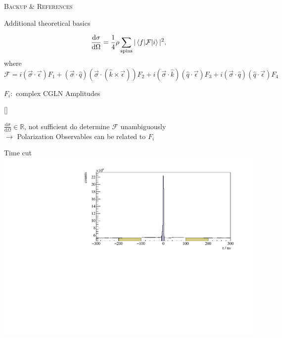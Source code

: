 \documentclass[11pt,aspectratio=169,dvipsnames]{beamer}
\newcommand{\thecolor}{black!70!blue}
\begin{document}
	\appendix
	\begin{frame}
		\centering
		\LARGE
		\color{\thecolor}\textsc{Backup \& References}
	\end{frame}
	\begin{frame}{Additional theoretical basics}
	\begin{tcolorbox}[colback=blue!5,colframe=\thecolor,title=Unpolarized differential cross section]
		
		$$\frac{\text{d}\sigma}{\text{d}\Omega}=\frac{1}{4}\rho\sum_{\text{spins}}|\braket{f|\mathcal{F}|i}|^2\\,$$
		where
		$$\mathcal{F}=i(\vec{\sigma}\cdot\vec{\epsilon})F_1+(\vec{\sigma}\cdot\hat{q})(\vec{\sigma}\cdot(\hat{k}\times\vec{\epsilon}))F_2+i(\vec{\sigma}\cdot\hat{k})(\hat{q}\cdot\vec{\epsilon})F_3+i(\vec{\sigma}\cdot\hat{q})(\hat{q}\cdot\vec{\epsilon})F_4$$
		\begin{flushright}
			$F_i:$ complex CGLN Amplitudes
		\end{flushright}
		
		
		\begin{flushright}
			{\scriptsize[\cite{cgln}]}
		\end{flushright}
	\end{tcolorbox}
	$\frac{\text{d}\sigma}{\text{d}\Omega}\in\mathbb{R}$, not sufficient do determine $\mathcal{F}$ unambiguously\\
	$\rightarrow$ Polarization Observables can be related to $F_i$
\end{frame}

\begin{frame}{Time cut}
	\includegraphics[width=\linewidth]{../../figs/hydrogen/time/reaction_time.pdf}
\end{frame}
\end{document}

